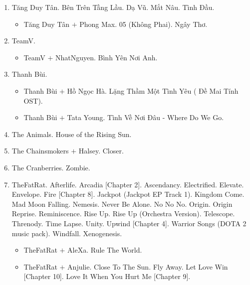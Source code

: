 \documentclass{article}
\begin{document}
\begin{enumerate}
	\begin{itemize}
		\item {\sc Taylor Swift $+$ Bon Iver.} Evermore.
		\item {\sc Taylor Swift $+$ Chris Stapleton.} I Bet You Think About Me (Taylor's version).
		\item {\sc Taylor Swift $+$ HAIM.} No Body, No Crime.
		\item {\sc Taylor Swift $+$ Maren Morris.} You All Over Me (From The Vault).
		\item {\sc Taylor Swift $+$ the National.} Coney Island.
	\end{itemize}
	\item {\sc Tăng Duy Tân.} Bên Trên Tầng Lầu. Dạ Vũ. Mắt Nâu. Tình Đầu.
	\begin{itemize}
		\item {\sc Tăng Duy Tân $+$ Phong Max.} 05 (Không Phai). Ngây Thơ.
	\end{itemize}
	\item {\sc TeamV.}
	\begin{itemize}
		\item {\sc TeamV $+$ NhatNguyen.} Bình Yên Nơi Anh.
	\end{itemize}
	\item {\sc Thanh Bùi.}
	\begin{itemize}
		\item {\sc Thanh Bùi $+$ Hồ Ngọc Hà.} Lặng Thầm Một Tình Yêu ( Đề Mai Tính OST).
		\item {\sc Thanh Bùi $+$ Tata Young.} Tình Về Nơi Đâu - Where Do We Go.
	\end{itemize}
	\item {\sc The Animals.} House of the Rising Sun.
	\item {\sc The Chainsmokers $+$ Halsey.} Closer.
	\item {\sc The Cranberries.} Zombie.
	\item {\sc TheFatRat.} Afterlife. Arcadia [Chapter 2]. Ascendancy. Electrified. Elevate. Envelope. Fire [Chapter 8]. Jackpot (Jackpot EP Track 1). Kingdom Come. Mad Moon Falling. Nemesis. Never Be Alone. No No No. Origin. Origin Reprise. Reminiscence. Rise Up. Rise Up (Orchestra Version). Telescope. Threnody. Time Lapse. Unity. Upwind [Chapter 4]. Warrior Songs (DOTA 2 music pack). Windfall. Xenogenesis.
	\begin{itemize}
		\item {\sc TheFatRat $+$ AleXa.} Rule The World.
		\item {\sc TheFatRat $+$ Anjulie.} Close To The Sun. Fly Away. Let Love Win [Chapter 10]. Love It When You Hurt Me [Chapter 9].

\end{itemize}
\end{enumerate}
\end{document}

